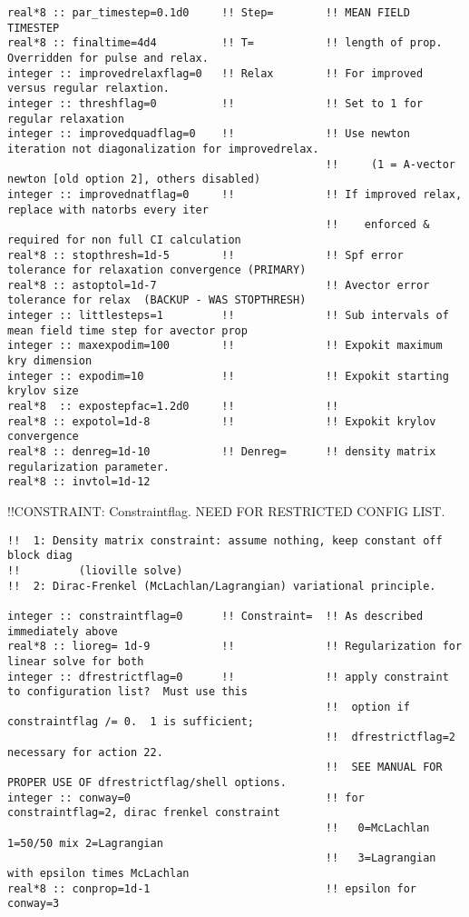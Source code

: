 \begin{verbatim}
real*8 :: par_timestep=0.1d0     !! Step=        !! MEAN FIELD TIMESTEP
real*8 :: finaltime=4d4          !! T=           !! length of prop.  Overridden for pulse and relax.  
integer :: improvedrelaxflag=0   !! Relax        !! For improved versus regular relaxtion.   
integer :: threshflag=0          !!              !! Set to 1 for regular relaxation
integer :: improvedquadflag=0    !!              !! Use newton iteration not diagonalization for improvedrelax.
                                                 !!     (1 = A-vector newton [old option 2], others disabled)
integer :: improvednatflag=0     !!              !! If improved relax, replace with natorbs every iter
                                                 !!    enforced & required for non full CI calculation
real*8 :: stopthresh=1d-5        !!              !! Spf error tolerance for relaxation convergence (PRIMARY)
real*8 :: astoptol=1d-7                          !! Avector error tolerance for relax  (BACKUP - WAS STOPTHRESH)
integer :: littlesteps=1         !!              !! Sub intervals of mean field time step for avector prop
integer :: maxexpodim=100        !!              !! Expokit maximum kry dimension
integer :: expodim=10            !!              !! Expokit starting krylov size
real*8  :: expostepfac=1.2d0     !!              !! 
real*8 :: expotol=1d-8           !!              !! Expokit krylov convergence 
real*8 :: denreg=1d-10           !! Denreg=      !! density matrix regularization parameter.
real*8 :: invtol=1d-12
\end{verbatim}
!!{\large \quad CONSTRAINT: Constraintflag. NEED FOR RESTRICTED CONFIG LIST.}
\begin{verbatim}
!!  1: Density matrix constraint: assume nothing, keep constant off block diag 
!!         (lioville solve)
!!  2: Dirac-Frenkel (McLachlan/Lagrangian) variational principle.

integer :: constraintflag=0      !! Constraint=  !! As described immediately above
real*8 :: lioreg= 1d-9           !!              !! Regularization for linear solve for both
integer :: dfrestrictflag=0      !!              !! apply constraint to configuration list?  Must use this
                                                 !!  option if constraintflag /= 0.  1 is sufficient;
                                                 !!  dfrestrictflag=2 necessary for action 22. 
                                                 !!  SEE MANUAL FOR PROPER USE OF dfrestrictflag/shell options.
integer :: conway=0                              !! for constraintflag=2, dirac frenkel constraint
                                                 !!   0=McLachlan 1=50/50 mix 2=Lagrangian
                                                 !!   3=Lagrangian with epsilon times McLachlan
real*8 :: conprop=1d-1                           !! epsilon for conway=3

\end{verbatim}
